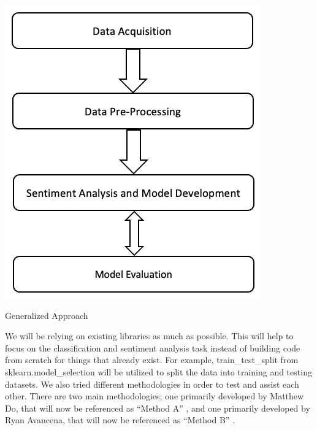 \documentclass[twocolumn,12pt]{article}
\makeatletter
\newenvironment{figurehere}
  {\def\@captype{figure}}
  {}
\makeatother
\begin{document}
\begin{flushleft}
	\begin{figurehere}
		\centering
		\includegraphics[width=0.6\linewidth]{images/gen_approachv2.png}
		\caption{Generalized Approach}
		\label{fig:gen_approach}
	\end{figurehere}
	
	We will be relying on existing libraries as much as possible. This will help to focus on the classification and sentiment analysis task instead of building code from scratch for things that already exist. For example, train\_test\_split from sklearn.model\_selection \cite{scdatasplit} will be utilized to split the data into training and testing datasets. We also tried different methodologies in order to test and assist each other. There are two main methodologies; one primarily developed by Matthew Do, that will now be referenced as \enquote{Method A} \cite{metha}, and one primarily developed by Ryan Avancena, that will now be referenced as \enquote{Method B} \cite{methb}.
		

\end{flushleft}
\end{document}
